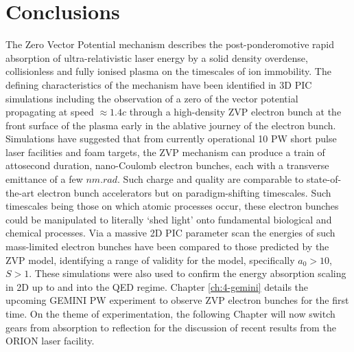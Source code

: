 



\section{Conclusions}\label{sec:zvp-conclusion}
The Zero Vector Potential mechanism describes the post-ponderomotive rapid absorption of ultra-relativistic laser energy by a solid density overdense, collisionless and fully ionised plasma on the timescales of ion immobility. The defining characteristics of the mechanism have been identified in 3D PIC simulations including the observation of a zero of the vector potential propagating at speed $\approx 1.4c$ through a high-density ZVP electron bunch at the front surface of the plasma early in the ablative journey of the electron bunch. Simulations have suggested that from currently operational 10 PW short pulse laser facilities and foam targets, the ZVP mechanism can produce a train of attosecond duration, nano-Coulomb electron bunches, each with a transverse emittance of a few $\unit{nm.rad}$. Such charge and quality are comparable to state-of-the-art electron bunch accelerators but on paradigm-shifting timescales. Such timescales being those on which atomic processes occur, these electron bunches could be manipulated to literally `shed light' onto fundamental biological and chemical processes. Via a massive 2D PIC parameter scan the energies of such mass-limited electron bunches have been compared to those predicted by the ZVP model, identifying a range of validity for the model, specifically $a_0>10$, $S>1$. These simulations were also used to confirm the energy absorption scaling in 2D up to and into the QED regime. Chapter \ref{ch:4-gemini} details the upcoming GEMINI PW experiment to observe ZVP electron bunches for the first time. On the theme of experimentation, the following Chapter will now switch gears from absorption to reflection for the discussion of recent results from the ORION laser facility.